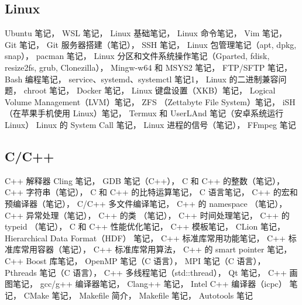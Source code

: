 \subsection{Linux}
Ubuntu 笔记，
WSL 笔记，
Linux 基础笔记，
Linux 命令笔记，
Vim 笔记，
Git 笔记，
Git 服务器搭建（笔记），
SSH 笔记，
Linux 包管理笔记（apt, dpkg, snap），
pacman 笔记，
Linux 分区和文件系统操作笔记（Gparted, fdisk, resize2fs, grub, Clonezilla），
Mingw-w64 和 MSYS2 笔记，
FTP/SFTP 笔记，
Bash 编程笔记，
service、systemd、systemctl 笔记1，
Linux 的二进制兼容问题，
chroot 笔记，
Docker 笔记，
Linux 键盘设置（XKB）笔记，
Logical Volume Management（LVM）笔记，
ZFS （Zettabyte File System）笔记，
iSH （在苹果手机使用 Linux）笔记，
Termux 和 UserLAnd 笔记（安卓系统运行 Linux）
Linux 的 System Call 笔记，
Linux 进程的信号（笔记），
FFmpeg 笔记

\subsection{C/C++}
C++ 解释器 Cling 笔记，
GDB 笔记（C++），
C 和 C++ 的整数（笔记），
C++ 字符串（笔记），
C 和 C++ 的比特运算笔记，
C 语言笔记，
C++ 的宏和预编译器（笔记），
C/C++ 多文件编译笔记，
C++ 的 namespace （笔记），
C++ 异常处理（笔记），
C++ 的类 （笔记），
C++ 时间处理笔记，
C++ 的 typeid （笔记），
C 和 C++ 性能优化笔记，
C++ 模板笔记，
CLion 笔记，
Hierarchical Data Format（HDF） 笔记，
C++ 标准库常用功能笔记，
C++ 标准库常用容器（笔记），
C++ 标准库常用算法，
C++ 的 smart pointer 笔记，
C++ Boost 库笔记，
OpenMP 笔记（C 语言），
MPI 笔记（C 语言），
Pthreads 笔记（C 语言），
C++ 多线程笔记（std::thread），
Qt 笔记，
C++ 画图笔记，
gcc/g++ 编译器笔记，
Clang++ 笔记，
Intel C++ 编译器（icpc） 笔记，
CMake 笔记，
Makefile 简介，
Makefile 笔记，
Autotools 笔记

